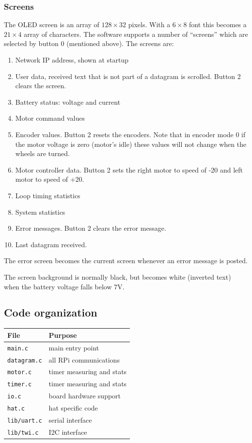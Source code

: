 \documentclass[11pt,fleqn]{article}
\begin{document}
\subsubsection{Screens}
The OLED screen is an array of $128\times 32$ pixels.  With a $6\times8$ font this becomes a $21\times4$ array of characters.
The software supports a number of ``screens'' which are
selected by button 0 (mentioned above).  The screens are:
\begin{enumerate}
\item Network IP address, shown at startup
\item User data, received text that is not part of a datagram is scrolled. Button 2 clears the screen.
\item Battery status: voltage and current
\item Motor command values
\item Encoder values. Button 2 resets the encoders.  Note that in encoder mode 0 if the motor voltage is zero (motor's idle) these values
will not change when the wheels are turned.
\item Motor controller data. Button 2 sets the right motor to speed of -20 and left motor to speed of +20.
\item Loop timing statistics
\item System statistics
\item Error messages. Button 2 clears the error message.
\item Last datagram received.
\end{enumerate}

The error screen becomes the current screen whenever an error message is posted.

The screen background is normally black, but becomes white (inverted text) when the battery voltage falls below 7\unit{V}.


\subsection{Code organization}

\begin{center}
\begin{tabular}{|l|l|} \hline
File & Purpose \\ \hline
\texttt{main.c} & main entry point \\
\texttt{datagram.c} & all RPi communications \\
\texttt{motor.c} & timer measuring and stats \\
\texttt{timer.c} & timer measuring and stats \\
\texttt{io.c} & board hardware support \\
\texttt{hat.c} & hat specific code \\
\texttt{lib/uart.c} & serial interface \\
\texttt{lib/twi.c} & I2C interface \\ \hline
\end{tabular}
\end{center}
\end{document}
